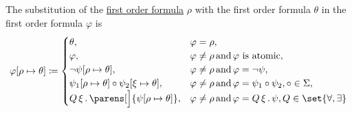 \begin{definition}
\begin{thmenum}
    The substitution of the \hyperref[def:first_order_syntax/formula]{first order formula} \( \rho \) with the first order formula \( \theta \) in the first order formula \( \varphi \) is
    \begin{equation}\label{eq:def:first_order_substitution/formula_in_formula}
      \varphi[\rho \mapsto \theta] \coloneqq \begin{cases}
        \theta,                                                       &\varphi = \rho, \\
        \varphi,                                                      &\varphi \neq \rho \T{and} \varphi \text{ is atomic}, \\
        \neg \psi[\rho \mapsto \theta],                               &\varphi \neq \rho \T{and} \varphi = \neg \psi, \\
        \psi_1[\rho \mapsto \theta] \circ \psi_2[\xi \mapsto \theta], &\varphi \neq \rho \T{and} \varphi = \psi_1 \circ \psi_2, \circ \in \Sigma, \\
        \quantifier{Q}{\xi} \parens[\Big]{\psi[\rho \mapsto \theta]},     &\varphi \neq \rho \T{and} \varphi = \quantifier{Q}{\xi} \psi, Q \in \set{ \forall, \exists }
      \end{cases}
    \end{equation}
  \end{thmenum}
\end{definition}

